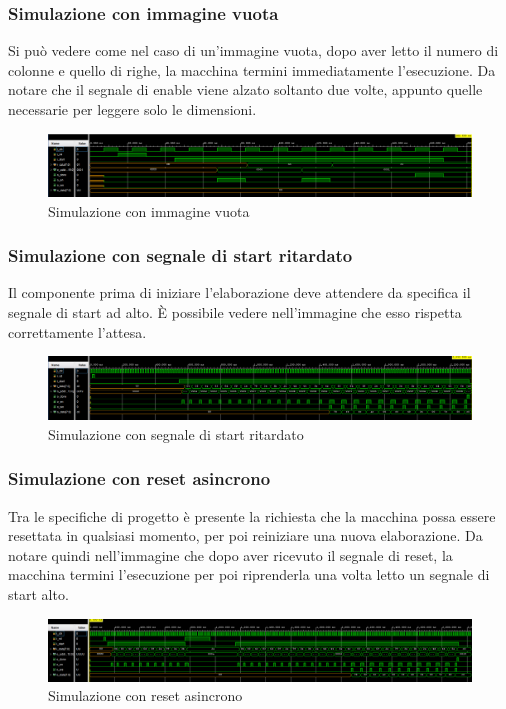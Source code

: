 \documentclass{article}
\begin{document}
\subsubsection{Simulazione con immagine vuota}
Si può vedere come nel caso di un'immagine vuota, dopo aver letto il numero di colonne e quello di righe, la macchina termini immediatamente l'esecuzione. Da notare che il segnale di enable viene alzato soltanto due volte, appunto quelle necessarie per leggere solo le dimensioni.
\begin{figure}[h]
    \includegraphics[width=\textwidth]{test-empty-image.png}
    \centering
    \caption{Simulazione con immagine vuota}
\end{figure}

\subsubsection{Simulazione con segnale di start ritardato}
Il componente prima di iniziare l'elaborazione deve attendere da specifica il segnale di start ad alto. È possibile vedere nell'immagine che esso rispetta correttamente l'attesa.
\begin{figure}[h]
    \includegraphics[width=\textwidth]{test-delayed-start.png}
    \centering
    \caption{Simulazione con segnale di start ritardato}
\end{figure}


\subsubsection{Simulazione con reset asincrono}
Tra le specifiche di progetto è presente la richiesta che la macchina possa essere resettata in qualsiasi momento, per poi reiniziare una nuova elaborazione. Da notare quindi nell'immagine che dopo aver ricevuto il segnale di reset, la macchina termini l'esecuzione per poi riprenderla una volta letto un segnale di start alto.
\begin{figure}[h]
    \includegraphics[width=\textwidth]{test-async-reset.png}
    \centering
    \caption{Simulazione con reset asincrono}
\end{figure}
\end{document}
